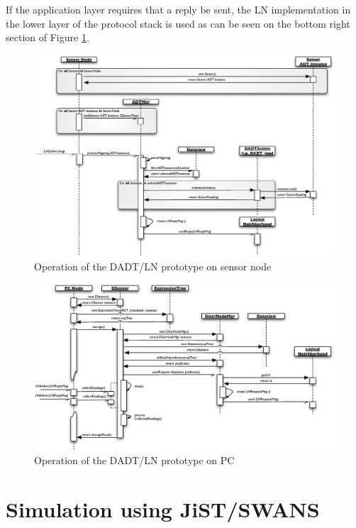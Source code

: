 If the application layer requires that a reply be sent, the LN implementation in
the lower layer of the protocol stack is used as can be seen on the bottom right
section of Figure \ref{Fig:SeqDiagram_Sensornode}.

\begin{figure}[p]
\centering
\label{Fig:SeqDiagram_Sensornode}
\includegraphics[scale=0.65]{img/SeqDiagram_Sensornode.eps} 
\caption[Operation
of the DADT/LN prototype on sensor node]{Operation
of the DADT/LN prototype on sensor node}
\end{figure} 


\begin{figure}[p]
\centering
\label{Fig:SeqDiagram_PCnode}
\includegraphics[scale=0.65, angle=90]{img/SeqDiagram_PCnode.eps} 
\caption[Operation
of the DADT/LN prototype on PC]{Operation
of the DADT/LN prototype on PC}
\end{figure} 

\section{Simulation using JiST/SWANS}

